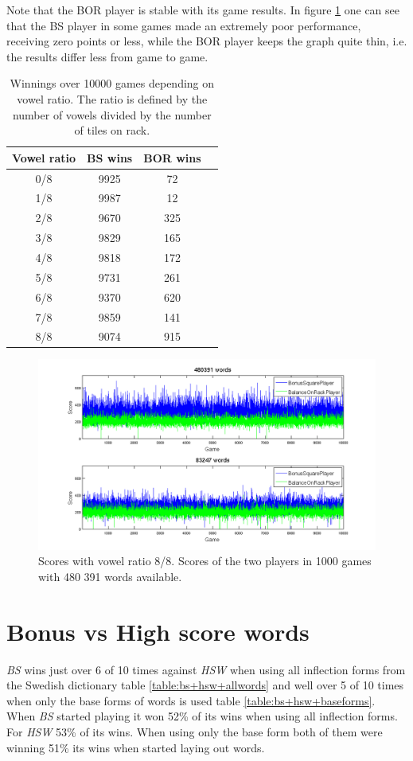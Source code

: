 \documentclass[a4paper, 12pt]{report}
\begin{document}
Note that the BOR player is stable with its game results. In figure \ref{fig:bonusBalanceLargeDict} one can see that the BS player in some games made an extremely poor performance, receiving zero points or less, while the BOR player keeps the graph quite thin, i.e. the results differ less from game to game.

\begin{table}[h]
\centering
    \begin{tabular}{ c | c | c  p{5cm}}
   	Vowel ratio & BS wins & BOR wins \\ \hline
	0/8 & 9925 & 72 \\ 
    	1/8 & 9987 & 12 \\ 
    	2/8 & 9670 & 325 \\ 
    	3/8 & 9829 & 165 \\ 
	4/8 & 9818 & 172 \\ 
	5/8 & 9731 & 261 \\ 
	6/8 & 9370 & 620 \\ 
	7/8 & 9859 & 141 \\ 
	8/8 & 9074 & 915 \\ 
    \end{tabular}
\caption{Winnings over 10000 games depending on vowel ratio. The ratio is defined by the number of vowels divided by the number of tiles on rack.}
\label{tab:bor+bs}
\end{table}

\begin{figure}[h]
\centering
\includegraphics[scale=0.45]{BonusBalance8vow_bothDict}
\caption {Scores with vowel ratio 8/8. Scores of the two players in 1000 games with 480 391 words available.}
\label{fig:bonusBalanceLargeDict}
\end{figure}



\section{Bonus vs High score words}
\label{sec:bonusHigh}
\emph{BS} wins just over 6 of 10 times against \emph{HSW} when using all inflection forms from the Swedish dictionary table \ref{table:bs+hsw+allwords} and well over 5 of 10 times when only the base forms of words is used table \ref{table:bs+hsw+baseforms}. When \emph{BS} started playing it won 52\% of its wins when using all inflection forms. For \emph{HSW} 53\% of its wins. When using only the base form both of them were winning 51\% its wins when started laying out words.
\end{document}
